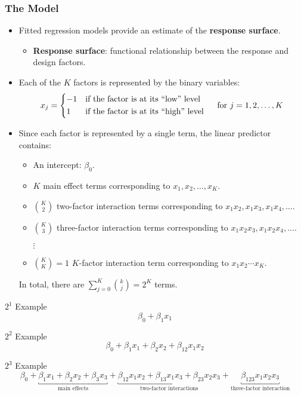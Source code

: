 \subsubsection*{The Model}
\begin{itemize}
      \item Fitted regression models provide an estimate of the \textbf{response surface}.
            \begin{itemize}[$\hookrightarrow$]
                  \item \textbf{Response surface}: functional relationship between the response and design factors.
            \end{itemize}
      \item Each of the $K$ factors is represented by the binary variables:
            \[ x_j=\begin{cases*}
                        -1 & if the factor is at its ``low'' level  \\
                        1  & if the factor is at its ``high'' level
                  \end{cases*}\quad \text{for }j=1,2,\ldots,K \]
      \item Since each factor is represented by a single term, the linear predictor contains:
            \begin{itemize}
                  \item An intercept: $ \beta_0 $.
                  \item $ K $ main effect terms corresponding to $ x_1,x_2,\ldots,x_K $.
                  \item $ \binom{K}{2} $ two-factor interaction terms corresponding to $ x_1x_2,x_1x_3,x_1x_4,\ldots $.
                  \item $ \binom{K}{3} $ three-factor interaction terms corresponding to $ x_1x_2x_3,x_1x_2x_4,\ldots $.
                  \item[$\vdots$]
                  \item $ \binom{K}{K}=1 $ $ K $-factor interaction term corresponding to $ x_1x_2\cdots x_K $.
            \end{itemize}
            In total, there are $ \sum_{j=0}^{K} \binom{k}{j}=2^K $ terms.
\end{itemize}
\begin{Example}{$ 2^1 $ Example}{}
      \[ \beta_0+\beta_1x_1 \]
\end{Example}
\begin{Example}{$ 2^2 $ Example}{}
      \[ \beta_0+\beta_1x_1+\beta_2x_2+\beta_{12}x_1x_2 \]
\end{Example}
\begin{Example}{$ 2^3 $ Example}{}
      \[ \beta_0+\underbracket{\beta_1x_1+\beta_2x_2+\beta_3x_3}_{\text{main effects}}+
            \underbracket{\beta_{12}x_1x_2+\beta_{13}x_1x_3+\beta_{23}x_2x_3}_{\text{two-factor interactions}}+
            \underbracket{\beta_{123}x_1x_2x_3}_{\text{three-factor interaction}} \]
\end{Example}
